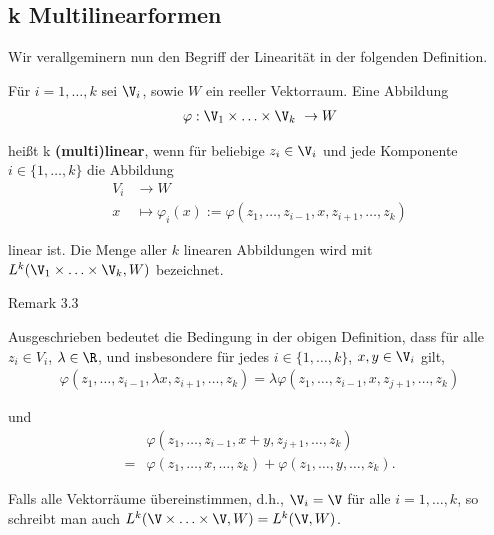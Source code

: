 \subsection{k Multilinearformen}
\label{\detokenize{vektoranalysis/multilinear:k-multilinearformen}}
\par
Wir verallgeminern nun den Begriff der Linearität in der folgenden Definition.
\label{vektoranalysis/multilinear:def:multilinear}
\begin{definition}{}{}



\par
Für \(i=1,\ldots,k\) sei \(\V_i\), sowie \(W\) ein reeller Vektorraum. Eine Abbildung
\begin{align*}
\varphi:\V_1\times\ldots\times \V_k\ \to W
\end{align*}
\par
heißt k \textbf{(multi)linear}, wenn für beliebige \(z_i\in\V_i\) und jede Komponente \(i\in\{1,\ldots,k\}\) die Abbildung
\begin{align*}
V_i &\to W\\
x&\mapsto \varphi_i(x):= \varphi(z_1,\ldots, z_{i-1}, x, z_{i+1},\ldots,z_k)
\end{align*}
\par
linear ist. Die Menge aller \(k\) linearen Abbildungen wird mit \(L^k(\V_1\times\ldots\times \V_k, W)\) bezeichnet.
\end{definition}
\label{vektoranalysis/multilinear:remark-6}
\begin{emphBox}{}{}{Remark 3.3}



\par
Ausgeschrieben bedeutet die Bedingung in der obigen Definition, dass für alle \(z_i\in V_i\), \(\lambda\in\R\),
und insbesondere für jedes \(i\in\{1,\ldots,k\}\), \(x,y\in \V_i\)  gilt,
\begin{align*}
\varphi(z_1,\ldots,z_{i-1},\lambda x, z_{i+1},\ldots,z_k) = \lambda
\varphi(z_1,\ldots,z_{i-1}, x, z_{j+1}, \ldots,z_k)
\end{align*}
\par
und
\begin{align*}
&\varphi(z_1,\ldots,z_{i-1},x+y,z_{j+1},\ldots,z_k)\\
= 
&\varphi(z_1,\ldots,x,\ldots,z_k) + \varphi(z_1,\ldots,y,\ldots,z_k).
\end{align*}\end{emphBox}

\par
Falls alle Vektorräume übereinstimmen, d.h., \(\V_i = \V\) für alle \(i=1,\ldots,k\), so schreibt man auch \(L^k(\V\times\ldots\times \V,W) = L^k(\V,W)\).


